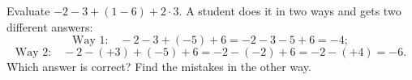 Evaluate $-2-3+(1-6)+2\cdot3$. A student does it in two ways and gets two different answers:
\[\text{Way 1:}\quad -2-3+(-5)+6=-2-3-5+6=-4;\]
\[\text{Way 2:}\quad -2-(+3)+(-5)+6=-2-(-2)+6=-2-(+4)=-6.\]
Which answer is correct? Find the mistakes in the other way.
